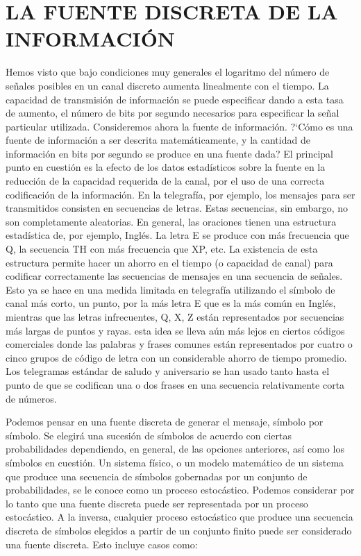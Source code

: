 \section{LA FUENTE DISCRETA DE LA INFORMACI\'ON}
Hemos visto que bajo condiciones muy generales el logaritmo del n\'umero de se\~nales 
posibles en un canal discreto aumenta linealmente con el tiempo. La capacidad de 
transmisi\'on de informaci\'on se puede especificar dando a esta tasa de aumento, el n\'umero 
de bits por segundo necesarios para especificar la se\~nal particular utilizada.
Consideremos ahora la fuente de informaci\'on. ?`C\'omo es una fuente de informaci\'on a ser 
descrita matem\'aticamente, y la cantidad de informaci\'on en bits por segundo se produce en una 
fuente dada? El principal punto en cuesti\'on es la efecto de los datos estad\'isticos sobre la 
fuente en la reducci\'on de la capacidad requerida de la canal, por el uso de una correcta 
codificaci\'on de la informaci\'on. En la telegraf\'ia, por ejemplo, los mensajes para ser 
transmitidos consisten en secuencias de letras. Estas secuencias, sin embargo, no son 
completamente aleatorias. En general, las oraciones tienen una estructura estad\'istica de, 
por ejemplo, Ingl\'es. La letra E se produce con m\'as frecuencia que Q, la secuencia TH con m\'as 
frecuencia que XP, etc. La existencia de esta estructura permite hacer un ahorro en el tiempo (o 
capacidad de canal) para codificar correctamente las secuencias de mensajes en una secuencia 
de se\~nales. Esto ya se hace en una medida limitada en telegraf\'ia utilizando el s\'imbolo de canal 
m\'as corto, un punto, por la m\'as letra E que es la m\'as com\'un en Ingl\'es, mientras que las letras infrecuentes, 
Q, X, Z est\'an representados por secuencias m\'as largas de puntos y rayas. esta idea se lleva a\'un 
m\'as lejos en ciertos c\'odigos comerciales donde las palabras y frases comunes est\'an representados
por cuatro o cinco grupos de c\'odigo de letra con un considerable ahorro de tiempo promedio. 
Los telegramas est\'andar de saludo y aniversario se han usado tanto hasta el punto de 
que se codifican una o dos frases en una secuencia relativamente corta de n\'umeros.

Podemos pensar en una fuente discreta de generar el mensaje, s\'imbolo por s\'imbolo. Se elegir\'a 
una sucesi\'on de s\'imbolos de acuerdo con ciertas probabilidades dependiendo, en general, 
de las opciones anteriores, as\'i como los s\'imbolos en cuesti\'on. Un sistema f\'isico, o 
un modelo matem\'atico de un sistema que produce una secuencia de s\'imbolos gobernadas por un 
conjunto de probabilidades, se le conoce como un proceso estoc\'astico. 
Podemos considerar por lo tanto que una fuente discreta puede ser representada por un proceso 
estoc\'astico. A la inversa, cualquier proceso estoc\'astico que produce una secuencia discreta 
de s\'imbolos elegidos a partir de un conjunto finito puede ser 
considerado una fuente discreta. Esto incluye casos como:

